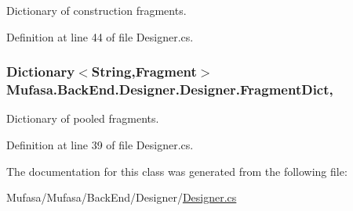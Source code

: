 Dictionary of construction fragments. 



Definition at line 44 of file Designer.\+cs.

\hypertarget{class_mufasa_1_1_back_end_1_1_designer_1_1_designer_a3d5c0eb4975b2b1339d3f66c0abcbeed}{
\subsubsection[{Fragment\+Dict}]{\setlength{\rightskip}{0pt plus 5cm}Dictionary$<$String,{\bf Fragment}$>$ Mufasa.\+Back\+End.\+Designer.\+Designer.\+Fragment\+Dict\hspace{0.3cm}{\ttfamily [get]}, {\ttfamily [set]}}}\label{class_mufasa_1_1_back_end_1_1_designer_1_1_designer_a3d5c0eb4975b2b1339d3f66c0abcbeed}


Dictionary of pooled fragments. 



Definition at line 39 of file Designer.\+cs.



The documentation for this class was generated from the following file\+:\begin{DoxyCompactItemize}
\item 
Mufasa/\+Mufasa/\+Back\+End/\+Designer/\hyperlink{_designer_8cs}{Designer.\+cs}\end{DoxyCompactItemize}
